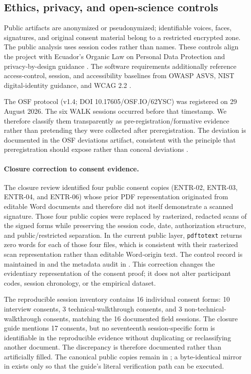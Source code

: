 \documentclass[pdflatex,sn-basic]{sn-jnl}
\begin{document}
\subsection{Ethics, privacy, and open-science controls}
Public artifacts are anonymized or pseudonymized; identifiable voices, faces, signatures, and original consent material belong to a restricted encrypted zone. The public analysis uses session codes rather than names. These controls align the project with Ecuador's Organic Law on Personal Data Protection and privacy-by-design guidance \cite{lopdp2021,spdp2025}. The software requirements additionally reference access-control, session, and accessibility baselines from OWASP ASVS, NIST digital-identity guidance, and WCAG 2.2 \cite{owasp2025,nist2025,wcag2024}.

The OSF protocol (v1.4; DOI 10.17605/OSF.IO/62YSC) was registered on 29 August 2026. The six WALK sessions occurred before that timestamp. We therefore classify them transparently as pre-registration/formative evidence rather than pretending they were collected after preregistration. The deviation is documented in the OSF deviations artifact, consistent with the principle that preregistration should expose rather than conceal deviations \cite{nosek2018,simmons2011,kerr1998}.

\paragraph{Closure correction to consent evidence.}
The closure review identified four public consent copies (ENTR-02, ENTR-03, ENTR-04, and ENTR-06) whose prior PDF representation originated from editable Word documents and therefore did not itself demonstrate a scanned signature. Those four public copies were replaced by rasterized, redacted scans of the signed forms while preserving the session code, date, authorization structure, and public/restricted separation. In the current public layer, \texttt{pdftotext} returns zero words for each of those four files, which is consistent with their rasterized scan representation rather than editable Word-origin text. The control record is maintained in  and the metadata audit in . This correction changes the evidentiary representation of the consent proof; it does not alter participant codes, session chronology, or the empirical dataset.

The reproducible session inventory contains 16 individual consent forms: 10 interview consents, 3 technical-walkthrough consents, and 3 non-technical-walkthrough consents, matching the 16 documented field sessions. The closure guide mentions 17 consents, but no seventeenth session-specific form is identifiable in the reproducible evidence without duplicating or reclassifying another document. The discrepancy is therefore documented rather than artificially filled. The canonical public copies remain in ; a byte-identical mirror in  exists only so that the guide's literal verification path can be executed.
\end{document}
